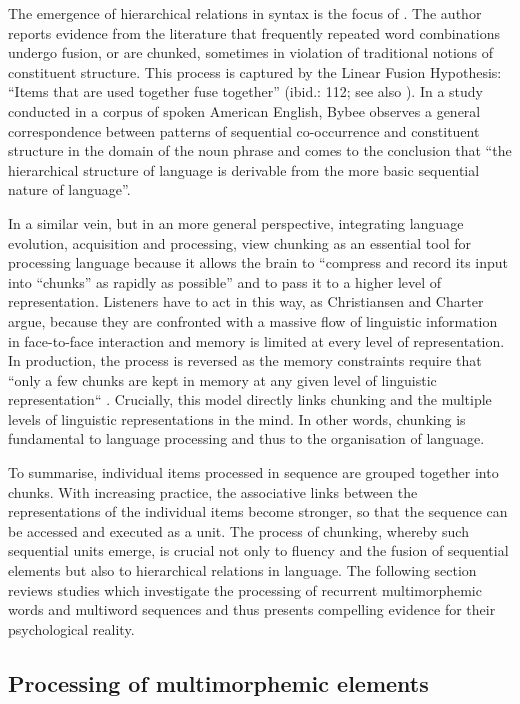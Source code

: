 The emergence of hierarchical relations in syntax is the focus of \citet{bybee-constituency-2002}. The author reports evidence from the literature that frequently repeated word combinations undergo fusion, or are chunked, sometimes in violation of traditional notions of constituent structure. This process is captured by the Linear Fusion Hypothesis: ``Items that are used together fuse together'' (ibid.: 112; see also \citealt{bybee-scheibman}). In a study conducted in a corpus of spoken American English, Bybee observes a general correspondence between patterns of sequential co-occurrence and constituent structure in the domain of the noun phrase and comes to the conclusion that ``the hierarchical structure of language is derivable from the more basic sequential nature of language''. 

In a similar vein, but in an more general perspective, integrating language evolution, acquisition and processing, \citet[][15]{christiansen-chater-2016} view chunking as an essential tool for processing language because it allows the brain to “compress and record its input into “chunks” as rapidly as possible” and to pass it to a higher level of representation. Listeners have to act in this way, as Christiansen and Charter argue, because they are confronted with a massive flow of linguistic information in face-to-face interaction and memory is limited at every level of representation. In production, the process is reversed as the memory constraints require that “only a few chunks are kept in memory at any given level of linguistic representation“ \citep[][102]{christiansen-chater-2016}. Crucially, this model directly links chunking and the multiple levels of linguistic representations in the mind. In other words, chunking is fundamental to language processing and thus to the organisation of language.

To summarise, individual items processed in sequence are grouped together into chunks. With increasing practice, the associative links between the representations of the individual items become stronger, so that the sequence can be accessed and executed as a unit. The process of chunking, whereby such sequential units emerge, is crucial not only to fluency and the fusion of sequential elements but also to hierarchical relations in language. The following section reviews studies which investigate the processing of recurrent multimorphemic words and multiword sequences and thus presents  compelling evidence for their psychological reality.  

\subsection{Processing of multimorphemic elements}
\label{processing}

